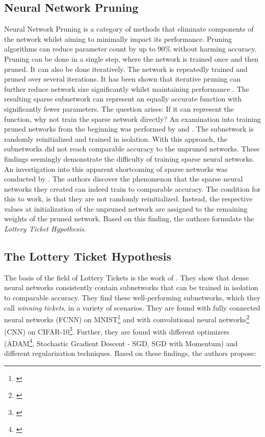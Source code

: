 \subsection{Neural Network Pruning}
Neural Network Pruning is a category of methods that eliminate components of the network whilst aiming to minimally impact its performance.
Pruning algorithms can reduce parameter count by up to 90\% without harming accuracy.
\autocite{LeCun, OptimalBrainSurgeon, HanEtAl15, PruningFiltersForEfficientConvets}
Pruning can be done in a single step, where the network is trained once and then pruned.
It can also be done iteratively. 
The network is repeatedly trained and pruned over several iterations. 
It has been shown that iterative pruning can further reduce network size significantly whilst maintaining performance \autocite{HanEtAl15}.
The resulting sparse subnetwork can represent an equally accurate function with significantly fewer parameters. 
The question arises: If it can represent the function, why not train the sparse network directly?
An examination into training pruned networks from the beginning was performed by \textcite{PruningFiltersForEfficientConvets} and \textcite{HanEtAl15}.
The subnetwork is randomly reinitialized and trained in isolation.
With this approach, the subnetworks did not reach comparable accuracy to the unpruned networks.
These findings seemingly demonstrate the difficulty of training sparse neural networks.
An investigation into this apparent shortcoming of sparse networks was conducted by \textcite{DBLP:conf/iclr/FrankleC19}.
The authors discover the phenomenon that the sparse neural networks they created can indeed train to comparable accuracy.
The condition for this to work, is that they are not randomly reinitialized. 
Instead, the respective values at initialization of the unpruned network are assigned to the remaining weights of the pruned network. 
Based on this finding, the authors formulate the \textit{Lottery Ticket Hypothesis}.

\subsection{The Lottery Ticket Hypothesis}
The basis of the field of Lottery Tickets is the work of \cite{DBLP:conf/iclr/FrankleC19}. 
They show that dense neural networks consistently contain subnetworks that can be trained in isolation to comparable accuracy.
They find these well-performing subnetworks, which they call \textit{winning tickets}, in a variety of scenarios.
They are found with fully connected neural networks (FCNN) on MNIST\footnote{\cite{mnist}} and with convolutional neural networks\footnote{\cite{cnn}} (CNN)  on CIFAR-10\footnote{\cite{cifar}}.
Further, they are found with different optimizers (ADAM\footnote{\cite{ADAM}}, Stochastic Gradient Descent - SGD, SGD with Momentum) and different regularization techniques.
Based on these findings, the authors propose:

